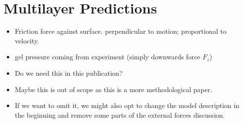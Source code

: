 \documentclass{article}
\begin{document}
\section{Multilayer Predictions}

\begin{itemize}
    \item Friction force against surface. perpendicular to motion; proportional to velocity.
    \item gel pressure coming from experiment (simply downwards force $F_z$)
\end{itemize}

\begin{itemize}
    \item Do we need this in this publication?
    \item Maybe this is out of scope as this is a more methodological paper.
    \item If we want to omit it, we might also opt to change the model description in the beginning
        and remove some parts of the external forces discussion.
\end{itemize}

\cite{You2019}
\end{document}
